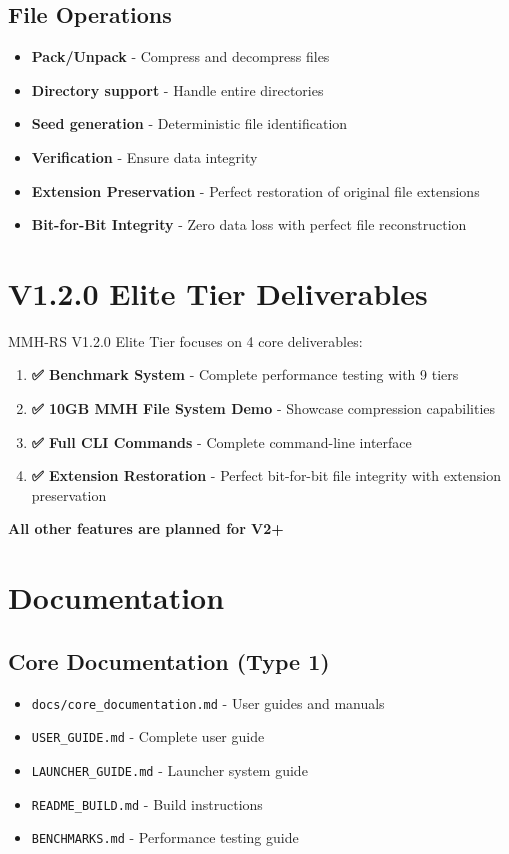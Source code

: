 \documentclass[11pt,a4paper]{article}
\begin{document}
	\subsection{File Operations}
	\begin{itemize}
		\item \textbf{Pack/Unpack} - Compress and decompress files
		\item \textbf{Directory support} - Handle entire directories
		\item \textbf{Seed generation} - Deterministic file identification
		\item \textbf{Verification} - Ensure data integrity
		\item \textbf{Extension Preservation} - Perfect restoration of original file extensions
		\item \textbf{Bit-for-Bit Integrity} - Zero data loss with perfect file reconstruction
	\end{itemize}

	\section{V1.2.0 Elite Tier Deliverables}
	\label{sec:deliverables}

	MMH-RS V1.2.0 Elite Tier focuses on 4 core deliverables:

	\begin{enumerate}
		\item \textbf{✅ Benchmark System} - Complete performance testing with 9 tiers
		\item \textbf{✅ 10GB MMH File System Demo} - Showcase compression capabilities
		\item \textbf{✅ Full CLI Commands} - Complete command-line interface
		\item \textbf{✅ Extension Restoration} - Perfect bit-for-bit file integrity with extension preservation
	\end{enumerate}

	\textbf{All other features are planned for V2+}

	\section{Documentation}
	\label{sec:documentation}

	\subsection{Core Documentation (Type 1)}
	\begin{itemize}
		\item \texttt{docs/core\_documentation.md} - User guides and manuals
		\item \texttt{USER\_GUIDE.md} - Complete user guide
		\item \texttt{LAUNCHER\_GUIDE.md} - Launcher system guide
		\item \texttt{README\_BUILD.md} - Build instructions
		\item \texttt{BENCHMARKS.md} - Performance testing guide
	\end{itemize}
\end{document}
